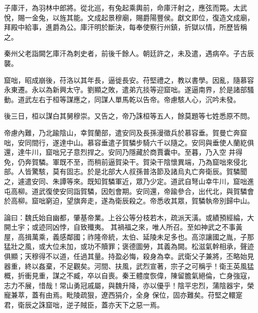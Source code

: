 \begin{pinyinscope}
 子庫汗，為羽林中郎將。從北巡，有兔起乘輿前，命庫汗射之，應弦而斃。太武悅，賜一金兔，以旌其能。文成起景穆廟，賜爵陽豐侯。獻文即位，復造文成廟，拜殿中給事，進爵為公。庫汗明於斷決，每奉使察行州鎮，折獄以情，所歷皆稱之。



 秦州父老詣闕乞庫汗為刺史者，前後千餘人。朝廷許之，未及遣，遇病卒。子古辰襲。



 窟咄，昭成崩後，苻洛以其年長，逼徙長安。苻堅禮之，教以書學。因亂，隨慕容永東遷。永以為新興太守。劉顯之敗，遣弟亢掞等迎窟咄。遂逼南界，於是諸部騷動。道武左右于桓等謀應之，同謀人單馬乾以告帝。帝慮駭人心，沉吟未發。



 後三日，桓以謀白其舅穆崇。又告之，帝乃誅桓等五人，餘莫題等七姓悉原不問。



 帝慮內難，乃北踰陰山，幸賀蘭部，遣安同及長孫漫徵兵於慕容垂。賀曼亡奔窟咄，安同間行，遂達中山。慕容垂遣子賀驎步騎六千以隨之。安同與垂使人蘭紇俱還，達牛川，窟咄兄子意烈捍之。安同乃隱藏於商賈囊中。至暮，乃入空
 井得免，仍奔賀驎。軍既不至，而稍前逼賀染干。賀染干陰懷異端，乃為窟咄來侵北部。人皆驚駭，莫有固志。於是北部大人叔孫普洛節及諸烏丸亡奔衛辰。賀驎聞之，遽遣安同、朱譚等來。既知賀驎軍近，眾乃少定。道武自弩山幸牛川，窟咄進屯高柳。道武復使安同詣賀驎，因剋會期。安同還，帝踰參合，出代北，與賀驎會於高柳。窟咄窮迫，望旗奔走，遂為衛辰殺之。帝悉收其眾，賀驎執帝別歸中山。



 論曰：魏氏始自幽都，肇基帝業。上谷公等分枝若木，疏派天潢。或績預經綸，大開土宇；或迹同凶悖，自致殲夷。
 其禍福之來，唯人所召。至如神武之不事黃屋，高揖萬乘，義感鄰國；祚隆帝統，太伯、延陵未足多也。高涼讓國之胤，子那猛壯之風，或大位未加，或功不贖罪；褒德圖勞，其義為闕。松滋氣幹相承，聲迹俱顯；天穆得不以道，任過其量。持盈必悔，殺身為幸。武衛父子兼將，丕略始見器重，終以姦棄，不足觀矣。河間、扶風，武烈宣著，宗子之可稱乎！衛王英風猛概，折衝見重，謀之不臧，卒以自喪。秦王體度恢偉，陳留膽氣絕倫，亡身強寇，志力不展，惜哉！常山勇冠戚屬，與魏升降，亦以優乎！陰平忠烈，蒲陰器宇，榮寵兼萃，蓋有由焉。毗陵疏狠，遼西狷介，全身
 保位，固亦難矣。苻堅之轘寔君，衛辰之誅窟咄，逆子賊臣，蓋亦天下之惡一焉。



\end{pinyinscope}